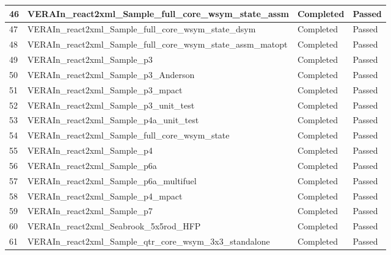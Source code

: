 \begin{longtable}[!ht]{|p{0.75cm}|p{11.25cm}|p{1.6cm}|p{1.1cm}|}
\rowcolor{caslcolor2}\small 46 & \small VERAIn\_react2xml\_Sample\_full\_core\_wsym\_state\_assm & \small Completed & \small Passed \\\hline
\rowcolor{caslcolor1}\small 47 & \small VERAIn\_react2xml\_Sample\_full\_core\_wsym\_state\_dsym & \small Completed & \small Passed \\\hline
\rowcolor{caslcolor2}\small 48 & \small VERAIn\_react2xml\_Sample\_full\_core\_wsym\_state\_assm\_matopt & \small Completed & \small Passed \\\hline
\rowcolor{caslcolor1}\small 49 & \small VERAIn\_react2xml\_Sample\_p3 & \small Completed & \small Passed \\\hline
\rowcolor{caslcolor2}\small 50 & \small VERAIn\_react2xml\_Sample\_p3\_Anderson & \small Completed & \small Passed \\\hline
\rowcolor{caslcolor1}\small 51 & \small VERAIn\_react2xml\_Sample\_p3\_mpact & \small Completed & \small Passed \\\hline
\rowcolor{caslcolor2}\small 52 & \small VERAIn\_react2xml\_Sample\_p3\_unit\_test & \small Completed & \small Passed \\\hline
\rowcolor{caslcolor1}\small 53 & \small VERAIn\_react2xml\_Sample\_p4a\_unit\_test & \small Completed & \small Passed \\\hline
\rowcolor{caslcolor2}\small 54 & \small VERAIn\_react2xml\_Sample\_full\_core\_wsym\_state & \small Completed & \small Passed \\\hline
\rowcolor{caslcolor1}\small 55 & \small VERAIn\_react2xml\_Sample\_p4 & \small Completed & \small Passed \\\hline
\rowcolor{caslcolor2}\small 56 & \small VERAIn\_react2xml\_Sample\_p6a & \small Completed & \small Passed \\\hline
\rowcolor{caslcolor1}\small 57 & \small VERAIn\_react2xml\_Sample\_p6a\_multifuel & \small Completed & \small Passed \\\hline
\rowcolor{caslcolor2}\small 58 & \small VERAIn\_react2xml\_Sample\_p4\_mpact & \small Completed & \small Passed \\\hline
\rowcolor{caslcolor1}\small 59 & \small VERAIn\_react2xml\_Sample\_p7 & \small Completed & \small Passed \\\hline
\rowcolor{caslcolor2}\small 60 & \small VERAIn\_react2xml\_Seabrook\_5x5rod\_HFP & \small Completed & \small Passed \\\hline
\rowcolor{caslcolor1}\small 61 & \small VERAIn\_react2xml\_Sample\_qtr\_core\_wsym\_3x3\_standalone & \small Completed & \small Passed \\\hline

\end{longtable}
